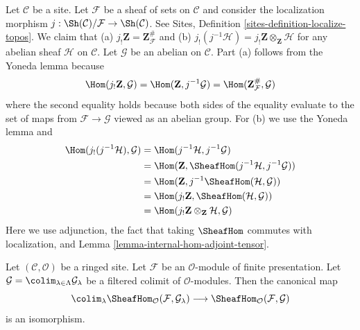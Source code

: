 \begin{remark}
\label{remark-j-shriek-tensor}
Let $\mathcal{C}$ be a site. Let $\mathcal{F}$ be a sheaf of
sets on $\mathcal{C}$ and consider the localization morphism
$j : \Sh(\mathcal{C})/\mathcal{F} \to \Sh(\mathcal{C})$.
See Sites, Definition \ref{sites-definition-localize-topos}.
We claim that (a) $j_!\mathbf{Z} = \mathbf{Z}_\mathcal{F}^\#$
and (b) $j_!(j^{-1}\mathcal{H}) = j_!\mathbf{Z} \otimes_\mathbf{Z} \mathcal{H}$
for any abelian sheaf $\mathcal{H}$ on $\mathcal{C}$.
Let $\mathcal{G}$ be an abelian on $\mathcal{C}$.
Part (a) follows from the Yoneda lemma because
$$
\Hom(j_!\mathbf{Z}, \mathcal{G}) =
\Hom(\mathbf{Z}, j^{-1}\mathcal{G}) =
\Hom(\mathbf{Z}_\mathcal{F}^\#, \mathcal{G})
$$
where the second equality holds because both sides of
the equality evaluate to the set of maps from $\mathcal{F} \to \mathcal{G}$
viewed as an abelian group. For (b) we use the Yoneda lemma and
\begin{align*}
\Hom(j_!(j^{-1}\mathcal{H}), \mathcal{G})
& =
\Hom(j^{-1}\mathcal{H}, j^{-1}\mathcal{G}) \\
& =
\Hom(\mathbf{Z}, \SheafHom(j^{-1}\mathcal{H}, j^{-1}\mathcal{G})) \\
& =
\Hom(\mathbf{Z}, j^{-1}\SheafHom(\mathcal{H}, \mathcal{G})) \\
& =
\Hom(j_!\mathbf{Z}, \SheafHom(\mathcal{H}, \mathcal{G})) \\
& =
\Hom(j_!\mathbf{Z} \otimes_\mathbf{Z} \mathcal{H}, \mathcal{G})
\end{align*}
Here we use adjunction, the fact that taking $\SheafHom$ commutes
with localization, and Lemma \ref{lemma-internal-hom-adjoint-tensor}.
\end{remark}

\begin{lemma}
\label{lemma-hom-finite-presentation-colimit}
Let $(\mathcal{C}, \mathcal{O})$ be a ringed site.
Let $\mathcal{F}$ be an $\mathcal{O}$-module of finite presentation. Let
$\mathcal{G} = \colim_{\lambda \in \Lambda} \mathcal{G}_\lambda$
be a filtered colimit of $\mathcal{O}$-modules. Then the canonical map
$$
\colim_\lambda \SheafHom_\mathcal{O}(\mathcal{F}, \mathcal{G}_\lambda)
\longrightarrow
\SheafHom_\mathcal{O}(\mathcal{F}, \mathcal{G})
$$
is an isomorphism.
\end{lemma}

